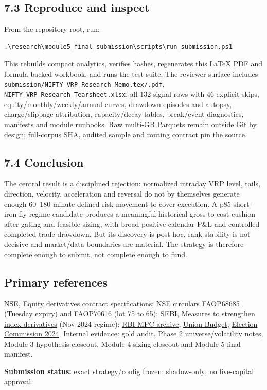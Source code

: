 \documentclass[10pt,a4paper]{article}
\begin{document}
\subsection*{7.3 Reproduce and inspect}
From the repository root, run:
\begin{verbatim}
.\research\module5_final_submission\scripts\run_submission.ps1
\end{verbatim}
This rebuilds compact analytics, verifies hashes, regenerates this LaTeX PDF and formula-backed workbook, and runs the test suite. The reviewer surface includes \texttt{submission/NIFTY\_VRP\_Research\_Memo.tex/.pdf}, \texttt{NIFTY\_VRP\_Research\_Tearsheet.xlsx}, all 132 signal rows with 46 explicit skips, equity/monthly/weekly/annual curves, drawdown episodes and autopsy, charge/slippage attribution, capacity/decay tables, break/event diagnostics, manifests and module runbooks. Raw multi-GB Parquets remain outside Git by design; full-corpus SHA, audited sample and routing contract pin the source.

\subsection*{7.4 Conclusion}
The central result is a disciplined rejection: normalized intraday VRP level, tails, direction, velocity, acceleration and reversal do not by themselves generate enough 60--180 minute defined-risk movement to cover execution. A p85 short-iron-fly regime candidate produces a meaningful historical gross-to-cost cushion after gating and feasible sizing, with broad positive calendar P\&L and controlled completed-trade drawdown. But its discovery is post-hoc, rank stability is not decisive and market/data boundaries are material. The strategy is therefore complete enough to submit, not complete enough to fund.

\subsection*{Primary references}
{\scriptsize
NSE, \href{https://www.nseindia.com/static/products-services/equity-derivatives-contract-specifications}{Equity derivatives contract specifications}; NSE circulars \href{https://nsearchives.nseindia.com/content/circulars/FAOP68685.pdf}{FAOP68685} (Tuesday expiry) and \href{https://nsearchives.nseindia.com/content/circulars/FAOP70616.pdf}{FAOP70616} (lot 75 to 65); SEBI, \href{https://www.sebi.gov.in/sebi_data/attachdocs/jul-2025/1751900271726.pdf}{Measures to strengthen index derivatives} (Nov-2024 regime); \href{https://www.rbi.org.in/scripts/Annualpolicy.aspx.html}{RBI MPC archive}; \href{https://www.indiabudget.gov.in/}{Union Budget}; \href{https://elections24.eci.gov.in/}{Election Commission 2024}. Internal evidence: gold audit, Phase 2 universe/volatility notes, Module 3 hypothesis closeout, Module 4 sizing closeout and Module 5 final manifest.}

\vfill
{\scriptsize\color{Grey}\textbf{Submission status:} exact strategy/config frozen; shadow-only; no live-capital approval.}
\end{document}
